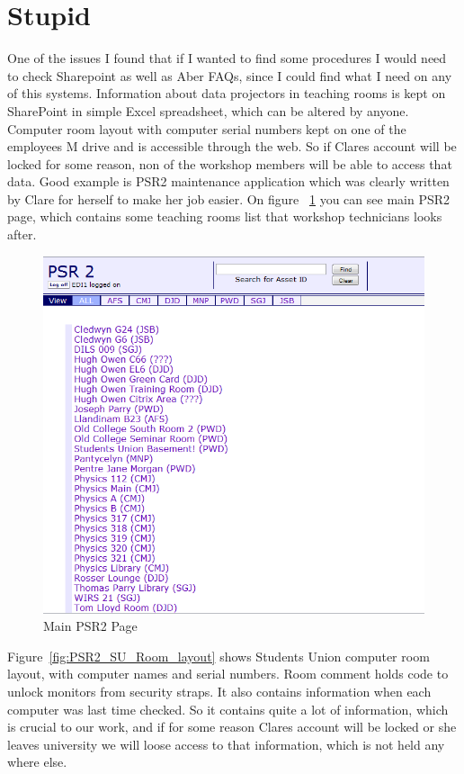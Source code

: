 \documentclass[10pt,a4paper,headinclude=true]{report}
\begin{document}
\section{Stupid}
One of the issues I found that if I wanted to find some procedures I would need to check Sharepoint as well as Aber FAQs, since I could find what I need on any of this systems. Information about data projectors in teaching rooms is kept on SharePoint in simple Excel spreadsheet, which can be altered by anyone. Computer room layout with computer serial numbers kept on one of the employees M drive and is accessible through the web. So if Clares account will be locked for some reason, non of the workshop members will be able to access that data. Good example is PSR2 maintenance application which was clearly written by Clare for herself to make her job easier. On figure ~\ref{fig:main_PSR2_page} you can see main PSR2 page, which contains some teaching rooms list that workshop technicians looks after.

\begin{figure}[H]
\centering
\centerline{\includegraphics[scale=0.3]{./PSR2}}
\caption{Main PSR2 Page}
\label{fig:main_PSR2_page}
\end{figure}

Figure~\ref{fig:PSR2_SU_Room_layout} shows Students Union computer room layout, with computer names and serial numbers. Room comment holds code to unlock monitors from security straps. It also contains information when each computer was last time checked. So it contains quite a lot of information, which is crucial to our work, and if for some reason Clares account will be locked or she leaves university we will loose access to that information, which is not held any where else.
\end{document}
